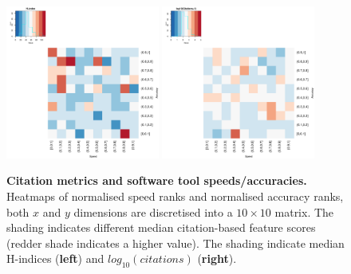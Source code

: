 \documentclass[fleqn,10pt]{SelfArx} %
\begin{document}
\begin{figure}[H]
\centering
\includegraphics[width=0.45\textwidth]{hindex-SpeedVsAccuracy-heatmap.pdf}
\includegraphics[width=0.45\textwidth]{cites-SpeedVsAccuracy-heatmap.pdf}
\caption{{\bf Citation metrics and software tool speeds/accuracies.} Heatmaps of normalised speed ranks and normalised accuracy
  ranks, both $x$ and $y$ dimensions are discretised into a $10 \times
  10$ matrix. The shading indicates different median citation-based
  feature scores (redder shade indicates a higher value).  The shading
  indicate median H-indices ({\bf left}) and $log_{10}(citations)$
  ({\bf right}). }
\label{fig:heatmaps}
\end{figure}
\end{document}
